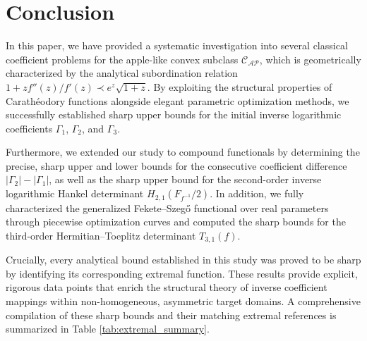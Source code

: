 \documentclass[11pt]{article}
\numberwithin{equation}{section}
\begin{document}
\section{Conclusion}
In this paper, we have provided a systematic investigation into several classical coefficient problems for the apple-like convex subclass $\mathcal{C}_{\mathcal{AP}}$, which is geometrically characterized by the analytical subordination relation $1+zf''(z)/f'(z) \prec e^z\sqrt{1+z}$. By exploiting the structural properties of Carath\'{e}odory functions alongside elegant parametric optimization methods, we successfully established sharp upper bounds for the initial inverse logarithmic coefficients $\Gamma_1$, $\Gamma_2$, and $\Gamma_3$. 

Furthermore, we extended our study to compound functionals by determining the precise, sharp upper and lower bounds for the consecutive coefficient difference $|\Gamma_2| - |\Gamma_1|$, as well as the sharp upper bound for the second-order inverse logarithmic Hankel determinant $H_{2,1}\left(F_{f^{-1}}/2\right)$. In addition, we fully characterized the generalized Fekete--Szeg\H{o} functional over real parameters through piecewise optimization curves and computed the sharp bounds for the third-order Hermitian--Toeplitz determinant $T_{3,1}(f)$.

Crucially, every analytical bound established in this study was proved to be sharp by identifying its corresponding extremal function. These results provide explicit, rigorous data points that enrich the structural theory of inverse coefficient mappings within non-homogeneous, asymmetric target domains. A comprehensive compilation of these sharp bounds and their matching extremal references is summarized in Table \ref{tab:extremal_summary}.
\end{document}
